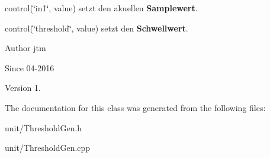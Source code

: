 \begin{DoxyItemize}
\item control(\char`\"{}in1\char`\"{}, value) setzt den akuellen {\bfseries Samplewert}.
\item control(\char`\"{}threshold\char`\"{}, value) setzt den {\bfseries Schwellwert}.
\end{DoxyItemize}

\begin{DoxyAuthor}{Author}
jtm 
\end{DoxyAuthor}
\begin{DoxySince}{Since}
04-\/2016 
\end{DoxySince}
\begin{DoxyVersion}{Version}
1. 
\end{DoxyVersion}


The documentation for this class was generated from the following files\+:\begin{DoxyCompactItemize}
\item 
unit/Threshold\+Gen.\+h\item 
unit/Threshold\+Gen.\+cpp\end{DoxyCompactItemize}
